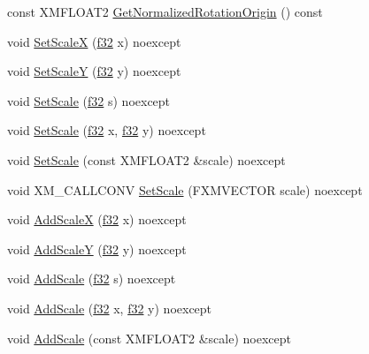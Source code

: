 \begin{DoxyCompactItemize}
\item 
const X\+M\+F\+L\+O\+A\+T2 \hyperlink{structmage_1_1_sprite_transform_aae811b88ac3cbd5ac18c67ddd81bef99}{Get\+Normalized\+Rotation\+Origin} () const
\item 
void \hyperlink{structmage_1_1_sprite_transform_a48f6fc9be7449427212b8ea1611a0780}{Set\+ScaleX} (\hyperlink{namespacemage_a6a44ad388483959dc4dff9f2aef91431}{f32} x) noexcept
\item 
void \hyperlink{structmage_1_1_sprite_transform_a86da604cef81c7df4121aadf08dc6ab0}{Set\+ScaleY} (\hyperlink{namespacemage_a6a44ad388483959dc4dff9f2aef91431}{f32} y) noexcept
\item 
void \hyperlink{structmage_1_1_sprite_transform_aff63b2be61c34a30d9b18b96dffebc36}{Set\+Scale} (\hyperlink{namespacemage_a6a44ad388483959dc4dff9f2aef91431}{f32} s) noexcept
\item 
void \hyperlink{structmage_1_1_sprite_transform_a100af807ca1f6f690594d8f29a2b1a05}{Set\+Scale} (\hyperlink{namespacemage_a6a44ad388483959dc4dff9f2aef91431}{f32} x, \hyperlink{namespacemage_a6a44ad388483959dc4dff9f2aef91431}{f32} y) noexcept
\item 
void \hyperlink{structmage_1_1_sprite_transform_aa79eda5450bbb7e46f5d51cb3be18276}{Set\+Scale} (const X\+M\+F\+L\+O\+A\+T2 \&scale) noexcept
\item 
void X\+M\+\_\+\+C\+A\+L\+L\+C\+O\+NV \hyperlink{structmage_1_1_sprite_transform_a1e9c60025ebbbaf88fe17af85526f5c8}{Set\+Scale} (F\+X\+M\+V\+E\+C\+T\+OR scale) noexcept
\item 
void \hyperlink{structmage_1_1_sprite_transform_adbeebf73091cde8db4950f076b97465c}{Add\+ScaleX} (\hyperlink{namespacemage_a6a44ad388483959dc4dff9f2aef91431}{f32} x) noexcept
\item 
void \hyperlink{structmage_1_1_sprite_transform_a93b60fa7983c636bc525762fca066527}{Add\+ScaleY} (\hyperlink{namespacemage_a6a44ad388483959dc4dff9f2aef91431}{f32} y) noexcept
\item 
void \hyperlink{structmage_1_1_sprite_transform_a47431cb73818ec2dfc62ca605ace39fa}{Add\+Scale} (\hyperlink{namespacemage_a6a44ad388483959dc4dff9f2aef91431}{f32} s) noexcept
\item 
void \hyperlink{structmage_1_1_sprite_transform_a51d6a13f3d543dcfb2ea6fc5b3fd1e11}{Add\+Scale} (\hyperlink{namespacemage_a6a44ad388483959dc4dff9f2aef91431}{f32} x, \hyperlink{namespacemage_a6a44ad388483959dc4dff9f2aef91431}{f32} y) noexcept
\item 
void \hyperlink{structmage_1_1_sprite_transform_aed6471e3e51cafe1a2f4651b0f1f4456}{Add\+Scale} (const X\+M\+F\+L\+O\+A\+T2 \&scale) noexcept

\end{DoxyCompactItemize}
